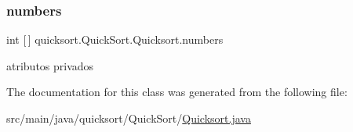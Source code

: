 \hypertarget{classquicksort_1_1_quick_sort_1_1_quicksort_aeb7f48cb8d62acde77b12cf78128aced}{}\label{classquicksort_1_1_quick_sort_1_1_quicksort_aeb7f48cb8d62acde77b12cf78128aced} 
\subsubsection{\texorpdfstring{numbers}{numbers}}
{\footnotesize\ttfamily int \mbox{[}$\,$\mbox{]} quicksort.\+Quick\+Sort.\+Quicksort.\+numbers\hspace{0.3cm}{\ttfamily [private]}}



atributos privados 



The documentation for this class was generated from the following file\+:\begin{DoxyCompactItemize}
\item 
src/main/java/quicksort/\+Quick\+Sort/\hyperlink{_quicksort_8java}{Quicksort.\+java}\end{DoxyCompactItemize}
